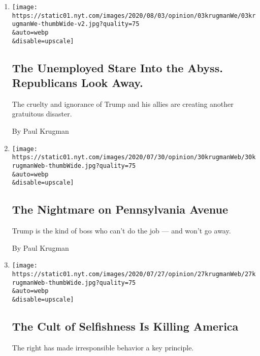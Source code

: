 \begin{enumerate}
\def\labelenumi{\arabic{enumi}.}
\item
  \href{/2020/08/03/opinion/republicans-unemployed-coronavirus.html}{}

  \texttt{[image: https://static01.nyt.com/images/2020/08/03/opinion/03krugmanWe/03krugmanWe-thumbWide-v2.jpg?quality=75\\\&auto=webp\\\&disable=upscale]}

  \hypertarget{the-unemployed-stare-into-the-abyss-republicans-look-away}{%
  \subsection{The Unemployed Stare Into the Abyss. Republicans Look
  Away.}\label{the-unemployed-stare-into-the-abyss-republicans-look-away}}

  The cruelty and ignorance of Trump and his allies are creating another
  gratuitous disaster.

  By Paul Krugman
\item
  \href{/2020/07/30/opinion/trump-coronavirus-economy.html}{}

  \texttt{[image: https://static01.nyt.com/images/2020/07/30/opinion/30krugmanWeb/30krugmanWeb-thumbWide.jpg?quality=75\\\&auto=webp\\\&disable=upscale]}

  \hypertarget{the-nightmare-on-pennsylvania-avenue}{%
  \subsection{The Nightmare on Pennsylvania
  Avenue}\label{the-nightmare-on-pennsylvania-avenue}}

  Trump is the kind of boss who can't do the job --- and won't go away.

  By Paul Krugman
\item
  \href{/2020/07/27/opinion/us-republicans-coronavirus.html}{}

  \texttt{[image: https://static01.nyt.com/images/2020/07/27/opinion/27krugmanWeb/27krugmanWeb-thumbWide.jpg?quality=75\\\&auto=webp\\\&disable=upscale]}

  \hypertarget{the-cult-of-selfishness-is-killing-america}{%
  \subsection{The Cult of Selfishness Is Killing
  America}\label{the-cult-of-selfishness-is-killing-america}}

  The right has made irresponsible behavior a key principle.


\end{enumerate}
